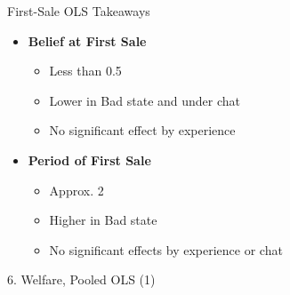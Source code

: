\documentclass{beamer}
\begin{document}
\begin{frame}{First-Sale OLS Takeaways}
\begin{itemize}
    \item \textbf{Belief at First Sale} 
    \begin{itemize}
        \item Less than 0.5
        \item Lower in Bad state and under chat
        \item No significant effect by experience
    \end{itemize}
\vspace{0.2in}
    \item \textbf{Period of First Sale}
    \begin{itemize}
        \item Approx. 2
        \item Higher in Bad state
        \item No significant effects by experience or chat
    \end{itemize}
\end{itemize}
\end{frame}


\begin{frame}{6. Welfare, Pooled OLS (1)}

\begin{center}
\end{center}
\end{frame}
\end{document}
